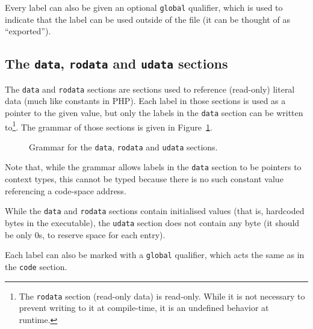 Every label can also be given an optional \texttt{global} qualifier, which is used to indicate that the label can be used outside of the file (it can be thought of as ``exported'').

\subsection{The \texttt{data}, \texttt{rodata} and \texttt{udata} sections}\label{subsec:nstar-common-sections-data}

The \texttt{data} and \texttt{rodata} sections are sections used to reference (read-only) literal data (much like constants in PHP).
Each label in those sections is used as a pointer to the given value, but only the labels in the \texttt{data} section can be written to\footnote{The \texttt{rodata} section (read-only data) is read-only. While it is not necessary to prevent writing to it at compile-time, it is an undefined behavior at runtime.}.
The grammar of those sections is given in Figure~\ref{fig:nstar-common-sections-data-grammar}.

\begin{figure}[htb]
	\centering


	\caption{Grammar for the \texttt{data}, \texttt{rodata} and \texttt{udata} sections.}
	\label{fig:nstar-common-sections-data-grammar}
\end{figure}

\noindent Note that, while the grammar allows labels in the \texttt{data} section to be pointers to context types, this cannot be typed because there is no such constant value referencing a code-space address.

While the \texttt{data} and \texttt{rodata} sections contain initialised values (that is, hardcoded bytes in the executable), the \texttt{udata} section does not contain any byte (it should be only $0$s, to reserve space for each entry).

Each label can also be marked with a \texttt{global} qualifier, which acts the same as in the \texttt{code} section.

